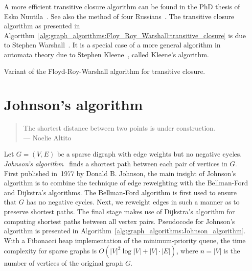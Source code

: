 A more efficient transitive closure algorithm can be found in the PhD
thesis of Esko Nuutila~\cite{Nuutila1995}. See
also the method of four Russians~\cite{AhoEtAl1974,ArlazarovEtAl1970}. The
transitive closure algorithm as presented in
Algorithm~\ref{alg:graph_algorithms:Floy_Roy_Warshall:transitive_closure}
is due to Stephen
Warshall~\cite{Warshall1962}. It is a special
case of a more general algorithm in automata
theory due to Stephen
Kleene~\cite{Kleene1956}, called Kleene's
algorithm.

\begin{algorithm}[!htbp]

\caption{Variant of the Floyd-Roy-Warshall algorithm for transitive closure.}
\label{alg:graph_algorithms:Floy_Roy_Warshall:transitive_closure}
\end{algorithm}



\section{Johnson's algorithm}

\begin{quote}
\footnotesize
The shortest distance between two points is under construction. \\
\noindent
--- Noelie Altito
\end{quote}

\noindent
Let $G = (V,E)$ be a sparse digraph with edge
weights but no negative cycles.
\emph{Johnson's algorithm}~\cite{Johnson1977}
finds a shortest path between each pair of vertices in $G$. First
published in~1977 by Donald B. Johnson, the
main insight of Johnson's algorithm is to
combine the technique of edge reweighting with the
Bellman-Ford and
Dijkstra's algorithms. The Bellman-Ford
algorithm is first used to ensure that $G$ has no negative
cycles. Next, we reweight edges
in such a manner as to preserve shortest
paths. The final stage makes use of Dijkstra's
algorithm for computing shortest paths between all vertex
pairs. Pseudocode for Johnson's algorithm is presented in
Algorithm~\ref{alg:graph_algorithms:Johnson_algorithm}. With a
Fibonacci heap implementation of the
minimum-priority queue, the time
complexity for sparse graphs is
$O(|V|^2 \log |V| + |V| \cdot |E|)$, where $n = |V|$ is the number of
vertices of the original graph $G$.

